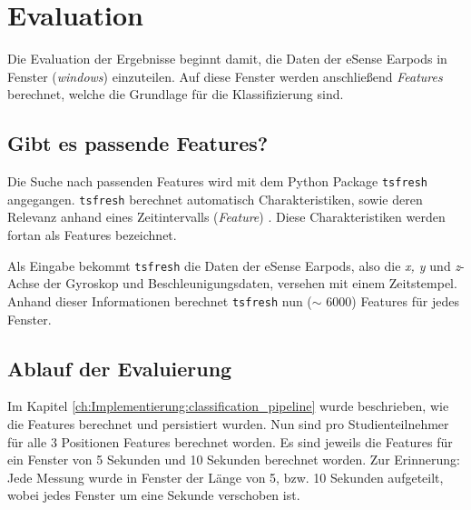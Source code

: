
\chapter{Evaluation}
\label{ch:Evaluation}
Die Evaluation der Ergebnisse beginnt damit, die Daten der eSense Earpods in Fenster (\textit{windows}) einzuteilen.
Auf diese Fenster werden anschließend \textit{Features} berechnet, welche die Grundlage für die Klassifizierung sind.

\section{Gibt es passende Features?}
Die Suche nach passenden Features wird mit dem Python Package \texttt{tsfresh} angegangen.
\texttt{tsfresh} berechnet automatisch Charakteristiken, sowie deren Relevanz anhand eines Zeitintervalls (\textit{Feature}) .
Diese Charakteristiken werden fortan als Features bezeichnet. 

Als Eingabe bekommt \texttt{tsfresh} die Daten der eSense Earpods, also die \textit{x, y} und \textit{z}- Achse der Gyroskop und Beschleunigungsdaten, versehen mit einem Zeitstempel. 
Anhand dieser Informationen berechnet \texttt{tsfresh} nun ($\sim$ 6000) Features für jedes Fenster.

\section{Ablauf der Evaluierung}
Im Kapitel \ref{ch:Implementierung:classification_pipeline} wurde beschrieben, wie die Features berechnet und persistiert wurden. 
Nun sind pro Studienteilnehmer für alle 3 Positionen Features berechnet worden. 
Es sind jeweils die Features für ein Fenster von 5 Sekunden und 10 Sekunden berechnet worden.
Zur Erinnerung: Jede Messung wurde in Fenster der Länge von 5, bzw. 10 Sekunden aufgeteilt, wobei jedes Fenster um eine Sekunde verschoben ist.


